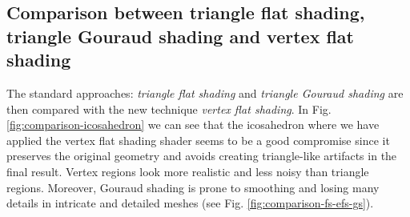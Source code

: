 \subsection{Comparison between triangle flat shading, triangle Gouraud shading and vertex flat shading}
The standard approaches: \textit{triangle flat shading} and \textit{triangle Gouraud shading} are then compared with the new technique \textit{vertex flat shading}. In Fig. \ref{fig:comparison-icosahedron} we can see that the icosahedron where we have applied the vertex flat shading shader seems to be a good compromise since it preserves the original geometry and avoids creating triangle-like artifacts in the final result. Vertex regions look more realistic and less noisy than triangle regions. Moreover, Gouraud shading is prone to smoothing and losing many details in intricate and detailed meshes (see Fig. \ref{fig:comparison-fs-efs-gs}).
